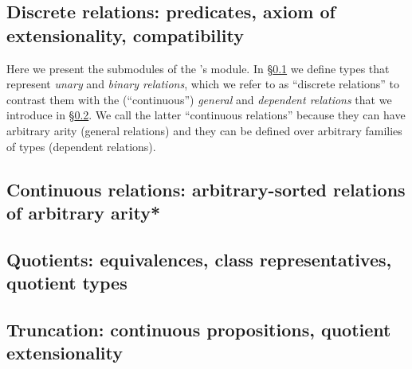 \documentclass[a4paper,UKenglish,cleveref,autoref,thm-restate,12pt]{../lipics-v2021-wjd}
\begin{document}
\subsection{Discrete relations: predicates, axiom of extensionality, compatibility}\label{sec:discrete-relations}
Here we present the submodules of the \agdaualib's  module. In \S\ref{sec:discrete-relations} we define types that represent \emph{unary} and \emph{binary relations}, which we refer to as ``discrete relations'' to contrast them with the (``continuous'') \emph{general} and \emph{dependent relations} that we introduce in \S\ref{sec:continuous-relations}. We call the latter ``continuous relations'' because they can have arbitrary arity (general relations) and they can be defined over arbitrary families of types (dependent relations).



\subsection{Continuous relations: arbitrary-sorted relations of arbitrary arity*}\label{sec:continuous-relations}\starredsection
{}


\subsection{Quotients: equivalences, class representatives, quotient types}\label{sec:equiv-relat-quot}


\subsection{Truncation: continuous propositions, quotient extensionality}\label{sec:trunc-sets-prop}

\end{document}
